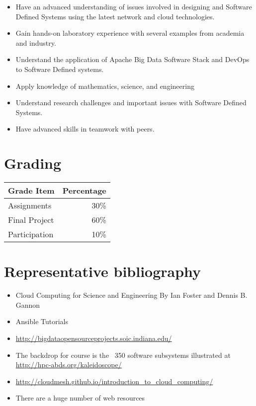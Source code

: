 \begin{itemize}
\item Have an advanced understanding of issues involved in designing
  and Software Defined Systems using the latest network and cloud
  technologies.
\item Gain hands-on laboratory experience with several examples from
  academia and industry.
\item Understand the application of Apache Big Data Software Stack and
  DevOps to Software Defined systems.
\item Apply knowledge of mathematics, science, and engineering
\item Understand research challenges and important issues with
  Software Defined Systems.
\item	Have advanced skills in teamwork with peers.
\end{itemize}

\section{Grading}

\begin{tabular}{lr}
Grade Item	  & Percentage\\
\hline
Assignments	  & 30\% \\
Final Project	& 60\% \\
Participation	& 10\% \\
\hline
\end{tabular}




\section{Representative bibliography}

\begin{itemize}
\item Cloud Computing for Science and Engineering By Ian Foster and
  Dennis
  B. Gannon
\item Ansible Tutorials
\item	\url{http://bigdataopensourceprojects.soic.indiana.edu/}
\item The backdrop for course is the ~350 software subsystems
  illustrated at \url{http://hpc-abds.org/kaleidoscope/}
\item	\url{http://cloudmesh.github.io/introduction_to_cloud_computing/}
\item	There are a huge number of web resources
\end{itemize}

